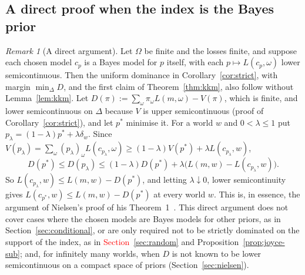 \documentclass[11pt]{article}
\theoremstyle{definition}
\theoremstyle{remark}
\newtheorem{remark}[theorem]{Remark}
\begin{document}
\subsection{A direct proof when the index is the Bayes prior}\label{sec:direct}
\begin{remark}[A direct argument]\label{rem:direct}
Let $\Omega$ be finite and the losses finite, and suppose each chosen model $c_p$ is a Bayes model for $p$ itself, with each $p\mapsto L(c_p,\omega)$ lower semicontinuous. Then the uniform dominance in Corollary~\ref{cor:strict}, with margin $\min_\Delta D$, and the first claim of Theorem~\ref{thm:kkm}, also follow without Lemma~\ref{lem:kkm}. Let $D(\pi):=\sum_\omega\pi_\omega L(m,\omega)-V(\pi)$, which is finite, and lower semicontinuous on $\Delta$ because $V$ is upper semicontinuous (proof of Corollary~\ref{cor:strict}), and let $p^*$ minimise it. For a world $w$ and $0<\lambda\le1$ put $p_\lambda=(1-\lambda)p^*+\lambda\delta_w$. Since $V(p_\lambda)=\sum_\omega(p_\lambda)_\omega L(c_{p_\lambda},\omega)\ge(1-\lambda)V(p^*)+\lambda L(c_{p_\lambda},w)$,
\[
 D(p^*)\le D(p_\lambda)\le(1-\lambda)D(p^*)+\lambda\bigl(L(m,w)-L(c_{p_\lambda},w)\bigr).
\]
So $L(c_{p_\lambda},w)\le L(m,w)-D(p^*)$, and letting $\lambda\downarrow0$, lower semicontinuity gives $L(c_{p^*},w)\le L(m,w)-D(p^*)$ at every world $w$. This is, in essence, the argument of Nielsen's proof of his Theorem~1~\cite[Appendix~C]{Nielsen}. This direct argument does not cover cases where the chosen models are Bayes models for other priors, as in Section~\ref{sec:conditional}, or are only required not to be strictly dominated on the support of the index, as in \textcolor{red}{Section~\ref{sec:random}} and Proposition~\ref{prop:joyce-sub}; and, for infinitely many worlds, when $D$ is not known to be lower semicontinuous on a compact space of priors (Section~\ref{sec:nielsen}).
\end{remark}
\end{document}
